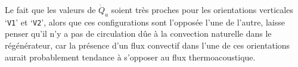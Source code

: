 


Le fait que les valeurs de $\dot Q_a$ soient très proches pour les orientations verticales `\texttt{V1}' et `\texttt{V2}', alors que ces configurations sont l'opposée l'une de l'autre, laisse penser qu'il n'y a pas de circulation dûe à la convection naturelle dans le régénérateur, car la présence d'un flux convectif dans l'une de ces orientations aurait probablement tendance à s'opposer au flux thermoacoustique. 



